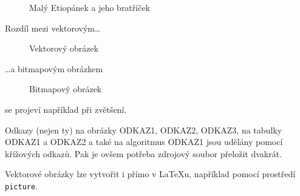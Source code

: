 \documentclass[11pt,a4paper]{article}
\begin{document}
\begin{figure}
\caption{Malý Etiopánek a jeho bratříček}
\label{img:etiopanek}
\end{figure}

Rozdíl mezi vektorovým\dots

\begin{figure}
\caption{Vektorový obrázek}
\label{img:oniisanvector}
\end{figure}

\dots a bitmapovým obrázkem

\begin{figure}
\caption{Bitmapový obrázek}
\label{img:oniisanbitmap}
\end{figure}

se projeví například při zvětšení.\par
Odkazy (nejen ty) na obrázky ODKAZ1, ODKAZ2, ODKAZ3, na tabulky ODKAZ1 a ODKAZ2 a také na algoritmus ODKAZ1 jsou udělány pomocí křížových odkazů. Pak je ovšem potřeba zdrojový soubor přeložit dvakrát.\par
Vektorové obrázky lze vytvořit i přímo v \LaTeX u, například pomocí prostředí \verb|picture|.
\end{document}

